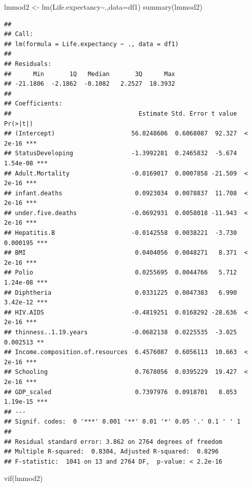 \documentclass[
]{article}
\newenvironment{Shaded}{\begin{snugshade}}{\end{snugshade}}
\newcommand{\AttributeTok}[1]{\textcolor[rgb]{0.77,0.63,0.00}{#1}}
\newcommand{\FunctionTok}[1]{\textcolor[rgb]{0.00,0.00,0.00}{#1}}
\newcommand{\NormalTok}[1]{#1}
\newcommand{\OtherTok}[1]{\textcolor[rgb]{0.56,0.35,0.01}{#1}}
\newcommand{\SpecialCharTok}[1]{\textcolor[rgb]{0.00,0.00,0.00}{#1}}
\begin{document}
\begin{Shaded}
\begin{Highlighting}[]
\NormalTok{lmmod2 }\OtherTok{\textless{}{-}} \FunctionTok{lm}\NormalTok{(Life.expectancy}\SpecialCharTok{\textasciitilde{}}\NormalTok{.,}\AttributeTok{data=}\NormalTok{df1)}
\FunctionTok{summary}\NormalTok{(lmmod2)}
\end{Highlighting}
\end{Shaded}

\begin{verbatim}
## 
## Call:
## lm(formula = Life.expectancy ~ ., data = df1)
## 
## Residuals:
##      Min       1Q   Median       3Q      Max 
## -21.1806  -2.1862  -0.1082   2.2527  18.3932 
## 
## Coefficients:
##                                   Estimate Std. Error t value Pr(>|t|)    
## (Intercept)                     56.0248606  0.6068087  92.327  < 2e-16 ***
## StatusDeveloping                -1.3992281  0.2465832  -5.674 1.54e-08 ***
## Adult.Mortality                 -0.0169017  0.0007858 -21.509  < 2e-16 ***
## infant.deaths                    0.0923034  0.0078837  11.708  < 2e-16 ***
## under.five.deaths               -0.0692931  0.0058018 -11.943  < 2e-16 ***
## Hepatitis.B                     -0.0142558  0.0038221  -3.730 0.000195 ***
## BMI                              0.0404056  0.0048271   8.371  < 2e-16 ***
## Polio                            0.0255695  0.0044766   5.712 1.24e-08 ***
## Diphtheria                       0.0331225  0.0047383   6.990 3.42e-12 ***
## HIV.AIDS                        -0.4819251  0.0168292 -28.636  < 2e-16 ***
## thinness..1.19.years            -0.0682138  0.0225535  -3.025 0.002513 ** 
## Income.composition.of.resources  6.4576087  0.6056113  10.663  < 2e-16 ***
## Schooling                        0.7678056  0.0395229  19.427  < 2e-16 ***
## GDP_scaled                       0.7397976  0.0918701   8.053 1.19e-15 ***
## ---
## Signif. codes:  0 '***' 0.001 '**' 0.01 '*' 0.05 '.' 0.1 ' ' 1
## 
## Residual standard error: 3.862 on 2764 degrees of freedom
## Multiple R-squared:  0.8304, Adjusted R-squared:  0.8296 
## F-statistic:  1041 on 13 and 2764 DF,  p-value: < 2.2e-16
\end{verbatim}

\begin{Shaded}
\begin{Highlighting}[]
\FunctionTok{vif}\NormalTok{(lmmod2)}
\end{Highlighting}
\end{Shaded}
\end{document}
